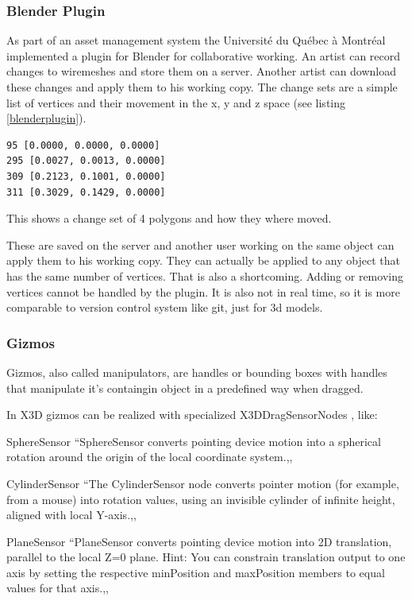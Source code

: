 \subsubsection{Blender Plugin}
\label{blender-plugin}

As part of an asset management system the Université du Québec à
Montréal implemented a plugin for Blender for collaborative working. An
artist can record changes to wiremeshes and store them on a server.
Another artist can download these changes and apply them to his working
copy. The change sets are a simple list of vertices and their movement in the
x, y and z space (see listing \ref{blenderplugin}). \cite{LCR07}

\begin{listing}
  \begin{verbatim}
95 [0.0000, 0.0000, 0.0000]
295 [0.0027, 0.0013, 0.0000]
309 [0.2123, 0.1001, 0.0000]
311 [0.3029, 0.1429, 0.0000]
  \end{verbatim}
  \caption{This shows a change set of 4 polygons and how they where moved.}
  \label{blenderplugin}
\end{listing}

These are saved on the server and another user working on the same
object can apply them to his working copy. They can actually be applied
to any object that has the same number of vertices. That is also a
shortcoming. Adding or removing vertices cannot be handled by the
plugin. It is also not in real time, so it is more comparable to version
control system like git, just for 3d models.

\subsubsection{Gizmos}\label{gizmos}

Gizmos, also called manipulators, are handles or bounding boxes with
handles that manipulate it's containgin object in a predefined way when
dragged. \cite{wikigizmo}

In X3D gizmos can be realized with specialized X3DDragSensorNodes \cite{x3ddragsensornode}, like:

\begin{description*}
\item[SphereSensor]
  ``SphereSensor converts pointing device motion into a spherical rotation around the origin of the local coordinate system.,, \cite{spheresensor}
\item[CylinderSensor]
  ``The CylinderSensor node converts pointer motion (for example, from a mouse) into rotation values, using an invisible cylinder of infinite height, aligned with local Y-axis.,, \cite{cylindersensor}
\item[PlaneSensor]
  ``PlaneSensor converts pointing device motion into 2D translation, parallel to the local Z=0 plane. Hint: You can constrain translation output to one axis by setting the respective minPosition and maxPosition members to equal values for that axis.,, \cite{planesensor}
\end{description*}

